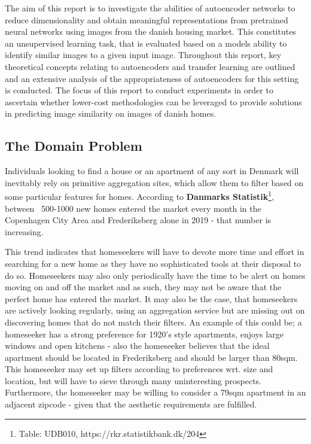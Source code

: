 The aim of this report is to investigate the abilities of autoencoder networks to reduce dimensionality and obtain meaningful representations from pretrained neural networks using images from the danish housing market.
This constitutes an unsupervised learning task, that is evaluated based on a models ability to identify similar images to a given input image.
Throughout this report, key theoretical concepts relating to autoencoders and transfer learning are outlined and an extensive analysis of the appropriateness of autoencoders for this setting is conducted.
The focus of this report to conduct experiments in order to ascertain whether lower-cost methodologies can be leveraged to provide solutions in predicting image similarity on images of danish homes.

\subsection{The Domain Problem}
Individuals looking to find a house or an apartment of any sort in Denmark will inevitably rely on primitive aggregation sites, which allow them to filter based on some particular features for homes.
According to \textbf{Danmarks Statistik}\footnote{Table: UDB010, https://rkr.statistikbank.dk/204}, between ~500-1000 new homes entered the market every month in the Copenhagen City Area and Frederiksberg alone in 2019 - that number is increasing.

This trend indicates that homeseekers will have to devote more time and effort in searching for a new home as they have no sophisticated tools at their disposal to do so. 
Homeseekers may also only periodically have the time to be alert on homes moving on and off the market and as such, they may not be aware that the perfect home has entered the market. 
\newline
It may also be the case, that homeseekers are actively looking regularly, using an aggregation service but are missing out on discovering homes that do not match their filters. 
An example of this could be; a homeseeker has a strong preference for 1920's style apartments, enjoys large windows and open kitchens - also the homeseeker believes that the ideal apartment should be located in Frederiksberg and should be larger than 80sqm.
This homeseeker may set up filters according to preferences wrt. size and location, but will have to sieve through many uninteresting prospects.
Furthermore, the homeseeker may be willing to consider a 79sqm apartment in an adjacent zipcode - given that the aesthetic requirements are fulfilled.

